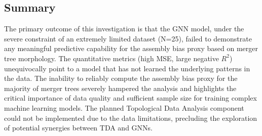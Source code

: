 \documentclass[twocolumn]{aastex631}
\begin{document}
\subsection{Summary}

The primary outcome of this investigation is that the GNN model, under the severe constraint of an extremely limited dataset (N=25), failed to demonstrate any meaningful predictive capability for the assembly bias proxy based on merger tree morphology. The quantitative metrics (high MSE, large negative $R^2$) unequivocally point to a model that has not learned the underlying patterns in the data. The inability to reliably compute the assembly bias proxy for the majority of merger trees severely hampered the analysis and highlights the critical importance of data quality and sufficient sample size for training complex machine learning models. The planned Topological Data Analysis component could not be implemented due to the data limitations, precluding the exploration of potential synergies between TDA and GNNs.
\end{document}
